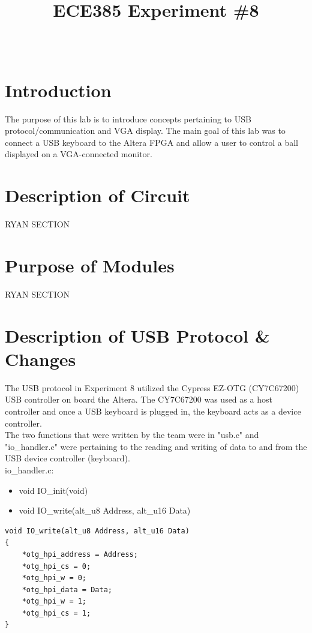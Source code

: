\documentclass[journal, twocolumn, final,11pt,letterpaper]{IEEEtran}
\title{ECE385 Experiment \#8
	}
\author{
\IEEEauthorblockN{Eric Meyers, Ryan Helsdingen}\\
\IEEEauthorblockA{Section ABG; TAs: Ben Delay, Shuo Liu \\
March 30th, 2016 \\
emeyer7, helsdin2}}
\begin{document}
	
\maketitle
\singlespacing

\section{Introduction}
The purpose of this lab is to introduce concepts pertaining to USB protocol/communication and VGA display. The main goal of this lab was to connect a USB keyboard to the Altera FPGA and allow a user to control a ball displayed on a VGA-connected monitor.

\section{Description of Circuit}
RYAN SECTION

\section{Purpose of Modules}
RYAN SECTION

\section{Description of USB Protocol \& Changes}
The USB protocol in Experiment 8 utilized the Cypress EZ-OTG (CY7C67200) USB controller on board the Altera. The CY7C67200 was used as a host controller and once a USB keyboard is plugged in, the keyboard acts as a device controller.\\

The two functions that were written by the team were in "usb.c" and "io\_handler.c" were pertaining to the reading and writing of data to and from the USB device controller (keyboard).\\

io\_handler.c:
\begin{itemize}
	\item 	void IO\_init(void)
	\item 	void IO\_write(alt\_u8 Address, alt\_u16 Data)
\end{itemize}


\begin{lstlisting}
void IO_write(alt_u8 Address, alt_u16 Data)
{
	*otg_hpi_address = Address;
	*otg_hpi_cs = 0;
	*otg_hpi_w = 0;
	*otg_hpi_data = Data;
	*otg_hpi_w = 1;
	*otg_hpi_cs = 1;
}
\end{lstlisting}
\end{document}
